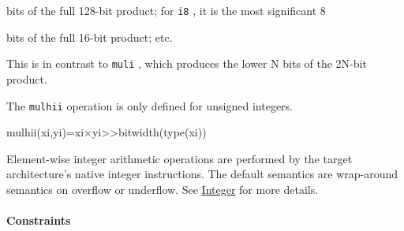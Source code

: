 \documentclass{article}
\begin{document}
bits of the full 128-bit product; for \texttt{i8} , it is the most significant 8

bits of the full 16-bit product; etc.


This is in contrast to \texttt{muli} , which produces the lower N bits of the 2N-bit product.


The \texttt{mulhii} operation is only defined for unsigned integers.


mulhii(xi,yi)=xi×yi>>bitwidth(type(xi))

Element-wise integer arithmetic operations are performed by the target architecture's native integer instructions. The default semantics are wrap-around semantics on overflow or underflow. See \href{https://docs.nvidia.com/cuda/tile-ir/latest/sections/operations.html#op-group-integer}{Integer} for more details.



\paragraph{Constraints}
\end{document}
